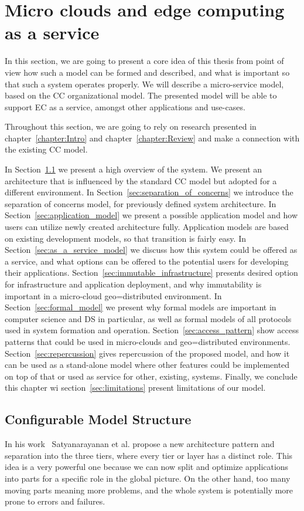 \chapter{Micro clouds and edge computing as a service}\label{chapter:Micro_clouds}
%
In this section, we are going to present a core idea of this thesis from point of view how such a model can be formed and described, and what is important so that such a system operates properly. We will describe a micro-service model, based on the CC organizational model.  The presented model will be able to support EC as a service, amongst other applications and use-cases. 

Throughout this section, we are going to rely on research presented in chapter~\ref{chapter:Intro} and chapter~\ref{chapter:Review} and make a connection with the existing CC model.

In Section~\ref{sec:configurable_model_structure} we present a high overview of the system. We present an architecture that is influenced by the standard CC model but adopted for a different environment. In Section~\ref{sec:separation_of_concerns} we introduce the separation of concerns model, for previously defined system architecture. In Section~\ref{sec:application_model} we present a possible application model and how users can utilize newly created architecture fully. Application models are based on existing development models, so that transition is fairly easy. In Section~\ref{sec:as_a_service_model} we discuss how this system could be offered as a service, and what options can be offered to the potential users for developing their applications. Section~\ref{sec:immutable_infrastructure} presents desired option for infrastructure and application deployment, and why immutability is important in a micro-cloud geo=distributed environment. In Section~\ref{sec:formal_model} we present why formal models are important in computer science and DS in particular, as well as formal models of all protocols used in system formation and operation. Section~\ref{sec:access_pattern} show access patterns that could be used in micro-clouds and geo=distributed environments. Section~\ref{sec:repercussion} gives repercussion of the proposed model, and how it can be used as a stand-alone model where other features could be implemented on top of that or used as service for other, existing, systems. Finally, we conclude this chapter wi section~\ref{sec:limitations} present limitations of our model.
%
%
\section{Configurable Model Structure}\label{sec:configurable_model_structure}
%
In his work~\cite{SatyanarayananK19} Satyanarayanan et al. propose a new architecture pattern and separation into the three tiers, where every tier or layer has a distinct role. This idea is a very powerful one because we can now split and optimize applications into parts for a specific role in the global picture. On the other hand, too many moving parts meaning more problems, and the whole system is potentially more prone to errors and failures.

